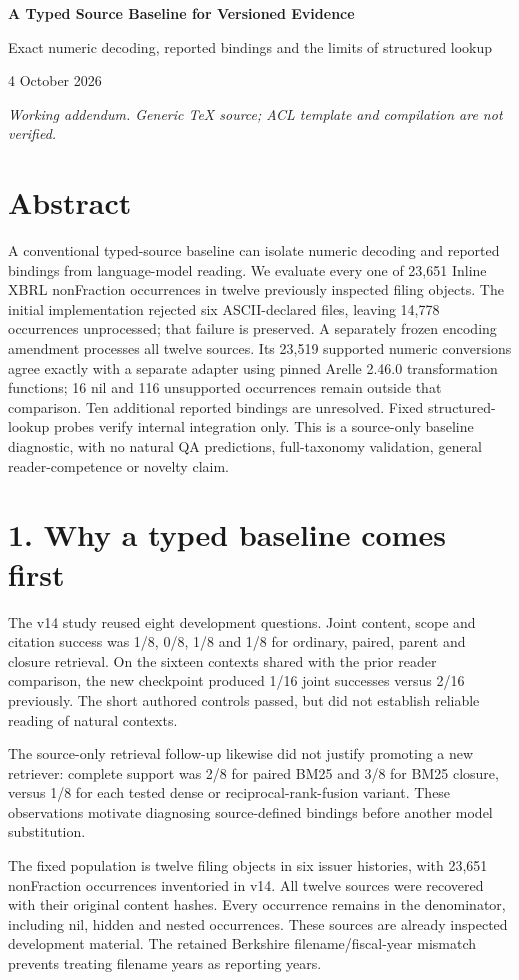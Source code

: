 \documentclass[10pt,a4paper]{article}
\begin{document}
\begin{center}{\Large\bfseries A Typed Source Baseline for Versioned Evidence}\par
Exact numeric decoding, reported bindings and the limits of structured lookup\par
4 October 2026\end{center}
\textit{Working addendum. Generic TeX source; ACL template and compilation are not verified.}
\section*{Abstract}
A conventional typed-source baseline can isolate numeric decoding and reported bindings from language-model reading. We evaluate every one of 23,651 Inline XBRL nonFraction occurrences in twelve previously inspected filing objects. The initial implementation rejected six ASCII-declared files, leaving 14,778 occurrences unprocessed; that failure is preserved. A separately frozen encoding amendment processes all twelve sources. Its 23,519 supported numeric conversions agree exactly with a separate adapter using pinned Arelle 2.46.0 transformation functions; 16 nil and 116 unsupported occurrences remain outside that comparison. Ten additional reported bindings are unresolved. Fixed structured-lookup probes verify internal integration only. This is a source-only baseline diagnostic, with no natural QA predictions, full-taxonomy validation, general reader-competence or novelty claim.
\section*{1. Why a typed baseline comes first}
The v14 study reused eight development questions. Joint content, scope and citation success was 1/8, 0/8, 1/8 and 1/8 for ordinary, paired, parent and closure retrieval. On the sixteen contexts shared with the prior reader comparison, the new checkpoint produced 1/16 joint successes versus 2/16 previously. The short authored controls passed, but did not establish reliable reading of natural contexts.

The source-only retrieval follow-up likewise did not justify promoting a new retriever: complete support was 2/8 for paired BM25 and 3/8 for BM25 closure, versus 1/8 for each tested dense or reciprocal-rank-fusion variant. These observations motivate diagnosing source-defined bindings before another model substitution.

The fixed population is twelve filing objects in six issuer histories, with 23,651 nonFraction occurrences inventoried in v14. All twelve sources were recovered with their original content hashes. Every occurrence remains in the denominator, including nil, hidden and nested occurrences. These sources are already inspected development material. The retained Berkshire filename/fiscal-year mismatch prevents treating filename years as reporting years.
\end{document}
